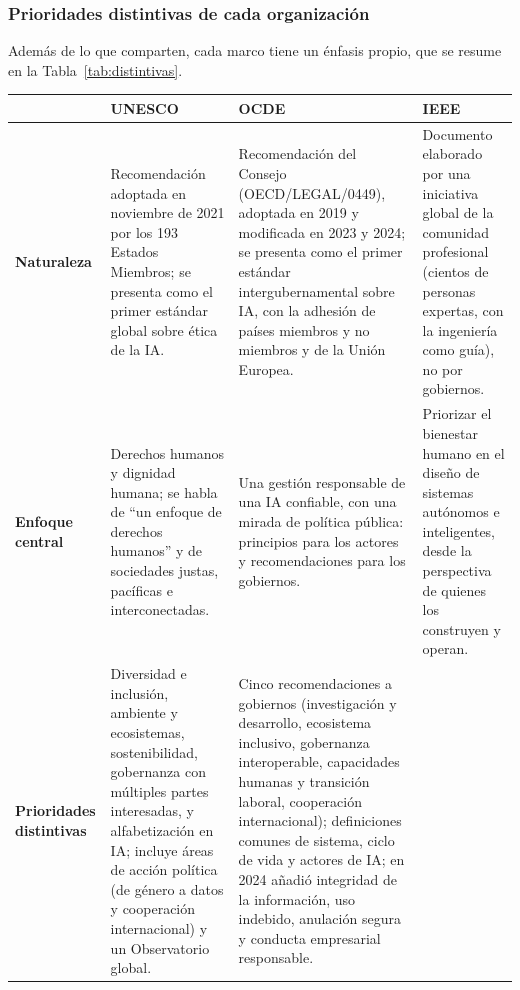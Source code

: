 \documentclass[11pt,letterpaper]{article}
\begin{document}
\subsubsection*{Prioridades distintivas de cada organización}

Además de lo que comparten, cada marco tiene un énfasis propio, que se resume en la Tabla~\ref{tab:distintivas}.

\begin{table}[H]
\centering\footnotesize
\setlength{\tabcolsep}{4pt}
\renewcommand{\arraystretch}{1.1}
\begin{tabularx}{\linewidth}{@{} >{\raggedright\arraybackslash}p{2.0cm} >{\raggedright\arraybackslash}X >{\raggedright\arraybackslash}X >{\raggedright\arraybackslash}X @{}}
\toprule
 & \textbf{UNESCO} & \textbf{OCDE} & \textbf{IEEE} \\
\midrule
\textbf{Naturaleza} &
Recomendación adoptada en noviembre de 2021 por los 193 Estados Miembros; se presenta como el primer estándar global sobre ética de la IA. &
Recomendación del Consejo (OECD/LEGAL/0449), adoptada en 2019 y modificada en 2023 y 2024; se presenta como el primer estándar intergubernamental sobre IA, con la adhesión de países miembros y no miembros y de la Unión Europea. &
Documento elaborado por una iniciativa global de la comunidad profesional (cientos de personas expertas, con la ingeniería como guía), no por gobiernos. \\
\addlinespace
\textbf{Enfoque central} &
Derechos humanos y dignidad humana; se habla de ``un enfoque de derechos humanos'' y de sociedades justas, pacíficas e interconectadas. &
Una gestión responsable de una IA confiable, con una mirada de política pública: principios para los actores y recomendaciones para los gobiernos. &
Priorizar el bienestar humano en el diseño de sistemas autónomos e inteligentes, desde la perspectiva de quienes los construyen y operan. \\
\addlinespace
\textbf{Prioridades distintivas} &
Diversidad e inclusión, ambiente y ecosistemas, sostenibilidad, gobernanza con múltiples partes interesadas, y alfabetización en IA; incluye áreas de acción política (de género a datos y cooperación internacional) y un Observatorio global. &
Cinco recomendaciones a gobiernos (investigación y desarrollo, ecosistema inclusivo, gobernanza interoperable, capacidades humanas y transición laboral, cooperación internacional); definiciones comunes de sistema, ciclo de vida y actores de IA; en 2024 añadió integridad de la información, uso indebido, anulación segura y conducta empresarial responsable. &

\end{tabularx}
\end{table}
\end{document}
